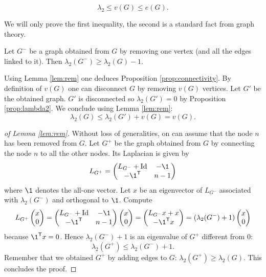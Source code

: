 \documentclass[11pt,nocut]{article}
\begin{document}
\begin{proposition}\label{prop:connectivity}
	$$
	\lambda_2 \leq v(G) \leq e(G).
	$$
\end{proposition}
We will only prove the first inequality, the second is a standard fact from graph theory.
\begin{lemma}\label{lem:rem}
	Let $G^{-}$ be a graph obtained from $G$ by removing one vertex (and all the edges linked to it). Then $\lambda_2(G^{-}) \geq \lambda_2(G) - 1$.
\end{lemma}
Using Lemma \ref{lem:rem} one deduces Proposition \ref{prop:connectivity}. By definition of $v(G)$ one can disconnect $G$ by removing $v(G)$ vertices. Let $G'$ be the obtained graph. $G'$ is disconnected so $\lambda_2(G') = 0$ by Proposition \ref{prop:lambda2}. We conclude using Lemma \ref{lem:rem}:
$$
\lambda_2(G) \leq \lambda_2(G') + v(G) = v(G).
$$
\begin{proof}[of Lemma \ref{lem:rem}]
	Without loss of generalities, on can assume that the node $n$ has been removed from $G$.
	Let $G^+$ be the graph obtained from $G$ by connecting the node $n$ to all the other nodes. Its Laplacian is given by
	$$
	L_{G^+} =
	\begin{pmatrix}
		L_{G^-} + \Id & -\1 \\
		-\1^{\sT} & n-1
	\end{pmatrix}
	$$
	where $\1$ denotes the all-one vector.
	Let $x$ be an eigenvector of $L_{G^-}$ associated with $\lambda_2(G^{-})$ and orthogonal to $\1$. Compute
	$$
	L_{G^+} 
	\begin{pmatrix}
		x\\
		0
	\end{pmatrix}
	=
	\begin{pmatrix}
		L_{G^-} + \Id & -\1 \\
		-\1^{\sT} & n-1
	\end{pmatrix}
	\begin{pmatrix}
		x\\
		0
	\end{pmatrix}
	=
	\begin{pmatrix}
		L_{G^-} x + x \\
		-\1^{\sT}x 
	\end{pmatrix}
	=
(\lambda_2(G^{-}) + 1)
	\begin{pmatrix}
		 x \\
		0
	\end{pmatrix}
	$$
	because $\1^{\sT}x=0$. Hence $\lambda_2(G^{-}) + 1$ is an eigenvalue of $G^+$ different from $0$:
	$$
	\lambda_2(G^+) \leq \lambda_2(G^{-}) + 1.
	$$
Remember that we obtained $G^+$ by adding edges to $G$: $\lambda_2(G^+) \geq \lambda_2(G)$. This concludes the proof. 
\end{proof}
\end{document}
